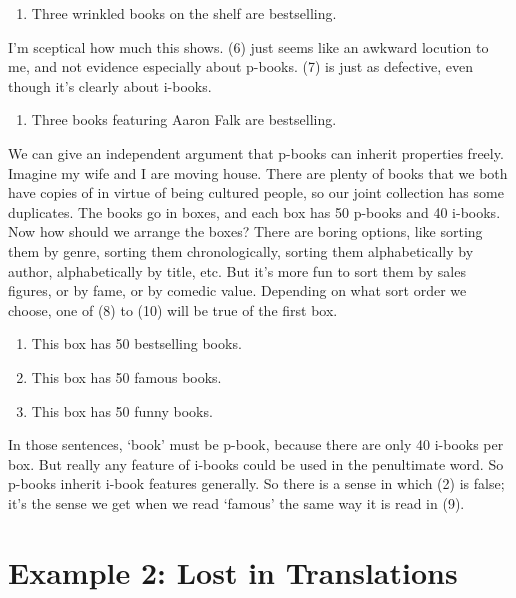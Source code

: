 \documentclass[
  11pt,
  letterpaper,
  DIV=11,
  numbers=noendperiod,
  twoside]{scrartcl}
\providecommand{\tightlist}{%
  \setlength{\itemsep}{0pt}\setlength{\parskip}{0pt}}
\begin{document}
\begin{enumerate}
\def\labelenumi{(\arabic{enumi})}
\setcounter{enumi}{5}
\tightlist
\item
  Three wrinkled books on the shelf are bestselling.
\end{enumerate}

I'm sceptical how much this shows. (6) just seems like an awkward
locution to me, and not evidence especially about p-books. (7) is just
as defective, even though it's clearly about i-books.

\begin{enumerate}
\def\labelenumi{(\arabic{enumi})}
\setcounter{enumi}{6}
\tightlist
\item
  Three books featuring Aaron Falk are bestselling.
\end{enumerate}

We can give an independent argument that p-books can inherit properties
freely. Imagine my wife and I are moving house. There are plenty of
books that we both have copies of in virtue of being cultured people, so
our joint collection has some duplicates. The books go in boxes, and
each box has 50 p-books and 40 i-books. Now how should we arrange the
boxes? There are boring options, like sorting them by genre, sorting
them chronologically, sorting them alphabetically by author,
alphabetically by title, etc. But it's more fun to sort them by sales
figures, or by fame, or by comedic value. Depending on what sort order
we choose, one of (8) to (10) will be true of the first box.

\begin{enumerate}
\def\labelenumi{(\arabic{enumi})}
\setcounter{enumi}{7}
\tightlist
\item
  This box has 50 bestselling books.
\item
  This box has 50 famous books.
\item
  This box has 50 funny books.
\end{enumerate}

In those sentences, `book' must be p-book, because there are only 40
i-books per box. But really any feature of i-books could be used in the
penultimate word. So p-books inherit i-book features generally. So there
is a sense in which (2) is false; it's the sense we get when we read
`famous' the same way it is read in (9).

\section{Example 2: Lost in
Translations}\label{example-2-lost-in-translations}
\end{document}
